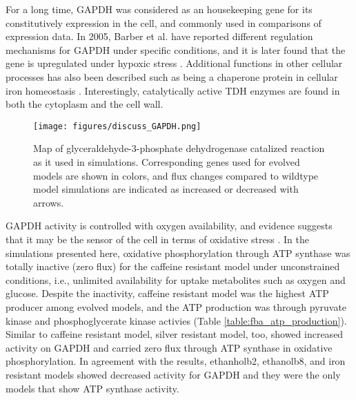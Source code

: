 For a long time, GAPDH was considered as an housekeeping gene for its constitutively expression in the cell, and commonly used in comparisons of expression data. In 2005, Barber et al. have reported different regulation mechanisms for GAPDH under specific conditions\cite{barber2005gapdh}, and it is later found that the gene is upregulated under hypoxic stress \cite{yang2008effects}. Additional functions in other cellular processes has also been described such as being a chaperone protein in cellular iron homeostasis \cite{sweeny2018glyceraldehyde}. Interestingly, catalytically active TDH enzymes are found in both the cytoplasm and the cell wall.

\begin{figure}[H]
\texttt{[image: figures/discuss\_GAPDH.png]}
\caption[Map of glyceraldehyde-3-phosphate dehydrogenase catalized reaction as it used in simulations]{Map of glyceraldehyde-3-phosphate dehydrogenase catalized reaction as it used in simulations. Corresponding genes used for evolved models are shown in colors, and flux changes compared to wildtype model simulations are indicated as increased or decreased with arrows.}
\label{fig:discuss_GAPDH}
\end{figure}

GAPDH activity is controlled with oxygen availability, and evidence suggests that it may be the sensor of the cell in terms of oxidative stress \cite{chuang2005glyceraldehyde}. In the simulations presented here, oxidative phosphorylation through ATP synthase was totally inactive (zero flux) for the caffeine resistant model under unconstrained conditions, i.e., unlimited availability for uptake metabolites such as oxygen and glucose. Despite the inactivity, caffeine resistant model was the highest ATP producer among evolved models, and the ATP production was through pyruvate kinase and phosphoglycerate kinase activies (Table \ref{table:fba_atp_production}). Similar to caffeine resistant model, silver resistant model, too, showed increased activity on GAPDH and carried zero flux through ATP synthase in oxidative phosphorylation. In agreement with the results, ethanholb2, ethanolb8, and iron resistant models showed decreased activity for GAPDH and they were the only models that show ATP synthase activity.

